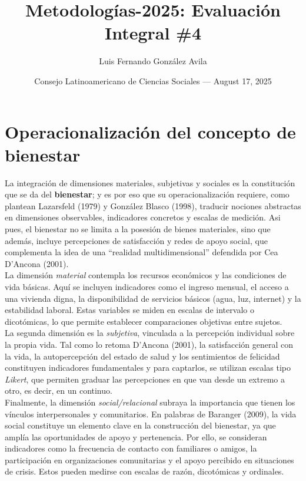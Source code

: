 \documentclass{article}
\title{Metodologías-2025: Evaluación Integral \#4} %
\author{Luis Fernando González Avila} %
\date{Consejo Latinoamericano de Ciencias Sociales --- August 17, 2025} %
\begin{document}
\maketitle %


\section*{Operacionalización del concepto de \textbf{bienestar}} %

La integración de dimensiones materiales, subjetivas y sociales es la constitución que se da del \textbf{bienestar}; y es por eso que su operacionalización requiere, como plantean Lazarsfeld (1979) y González Blasco (1998), traducir nociones abstractas en dimensiones observables, indicadores concretos y escalas de medición. Asi pues, el bienestar no se limita a la posesión de bienes materiales, sino que además, incluye percepciones de satisfacción y redes de apoyo social, que complementa la idea de una “realidad multidimensional” defendida por Cea D’Ancona (2001).\\

\noindent La dimensión \textit{material} contempla los recursos económicos y las condiciones de vida básicas. Aquí se incluyen indicadores como el ingreso mensual, el acceso a una vivienda digna, la disponibilidad de servicios básicos (agua, luz, internet) y la estabilidad laboral. Estas variables se miden en escalas de intervalo o dicotómicas, lo que permite establecer comparaciones objetivas entre sujetos.\\

\noindent La segunda dimensión es la \textit{subjetiva}, vinculada a la percepción individual sobre la propia vida. Tal como lo retoma D'Ancona (2001), la satisfacción general con la vida, la autopercepción del estado de salud y los sentimientos de felicidad constituyen indicadores fundamentales y para captarlos, se utilizan escalas tipo \textit{Likert}, que permiten graduar las percepciones en que van desde un extremo a otro, es decir, en un continuo.\\

\noindent Finalmente, la dimensión \textit{social/relacional} subraya la importancia que tienen los vínculos interpersonales y comunitarios. En palabras de Baranger (2009), la vida social constituye un elemento clave en la construcción del bienestar, ya que amplía las oportunidades de apoyo y pertenencia. Por ello, se consideran indicadores como la frecuencia de contacto con familiares o amigos, la participación en organizaciones comunitarias y el apoyo percibido en situaciones de crisis. Estos pueden medirse con escalas de razón, dicotómicas y ordinales.\\
\end{document}
